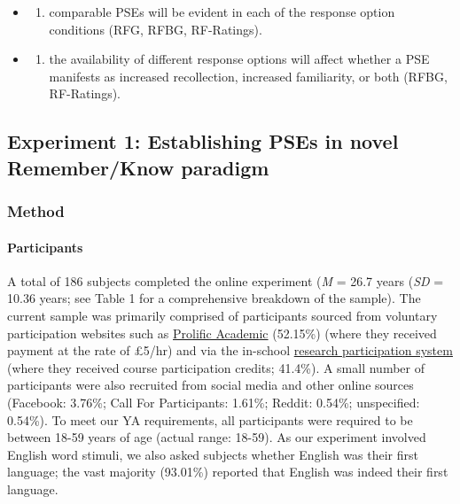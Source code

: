 \documentclass[
  11pt,
]{article}
\providecommand{\tightlist}{%
  \setlength{\itemsep}{0pt}\setlength{\parskip}{0pt}}
\begin{document}
\begin{enumerate}
  \begin{itemize}
  \item
    \begin{enumerate}
    \def\labelenumii{\roman{enumii})}
    \tightlist
    \item
      comparable PSEs will be evident in each of the response option
      conditions (RFG, RFBG, RF-Ratings).
    \end{enumerate}
  \item
    \begin{enumerate}
    \def\labelenumii{\roman{enumii})}
    \setcounter{enumii}{1}
    \tightlist
    \item
      the availability of different response options will affect whether
      a PSE manifests as increased recollection, increased familiarity,
      or both (RFBG, RF-Ratings).
    \end{enumerate}
  \end{itemize}
\end{enumerate}

\hypertarget{experiment-1-establishing-pses-in-novel-rememberknow-paradigm}{%
\subsection{Experiment 1: Establishing PSEs in novel Remember/Know
paradigm}\label{experiment-1-establishing-pses-in-novel-rememberknow-paradigm}}

\hypertarget{method}{%
\subsubsection{Method}\label{method}}

\hypertarget{participants}{%
\paragraph{Participants}\label{participants}}

A total of 186 subjects completed the online experiment (\emph{M} = 26.7
years (\emph{SD} = 10.36 years; see Table 1 for a comprehensive
breakdown of the sample). The current sample was primarily comprised of
participants sourced from voluntary participation websites such as
\href{https://www.prolific.co/}{Prolific Academic} (52.15\%) (where they
received payment at the rate of £5/hr) and via the in-school
\href{https://keelepsychology.sona-systems.com/}{research participation system}
(where they received course participation credits; 41.4\%). A small
number of participants were also recruited from social media and other
online sources (Facebook: 3.76\%; Call For Participants: 1.61\%; Reddit:
0.54\%; unspecified: 0.54\%). To meet our YA requirements, all
participants were required to be between 18-59 years of age (actual
range: 18-59). As our experiment involved English word stimuli, we also
asked subjects whether English was their first language; the vast
majority (93.01\%) reported that English was indeed their first
language.
\end{document}
